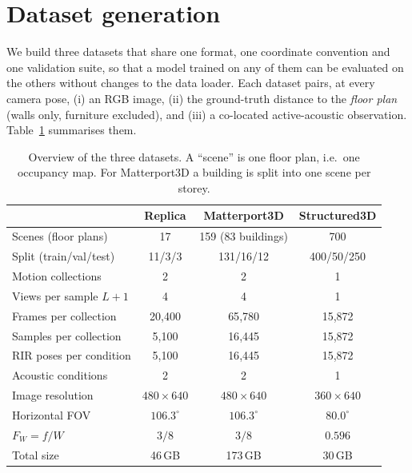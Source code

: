 %

\section{Dataset generation}
\label{sec:supp-data}

We build three datasets that share one format, one coordinate convention and one
validation suite, so that a model trained on any of them can be evaluated on the
others without changes to the data loader. Each dataset pairs, at every camera
pose, (i) an RGB image, (ii) the ground-truth distance to the \emph{floor plan}
(walls only, furniture excluded), and (iii) a co-located active-acoustic
observation. Table~\ref{tab:supp-overview} summarises them.

\begin{table}[t]
\centering
\caption{Overview of the three datasets. A ``scene'' is one floor plan, i.e.\ one
occupancy map. For Matterport3D a building is split into one scene per storey.}
\label{tab:supp-overview}
\small
\begin{tabular}{lccc}
\toprule
 & Replica & Matterport3D & Structured3D \\
\midrule
Scenes (floor plans)            & 17 & 159 (83 buildings) & 700 \\
Split (train/val/test)          & 11/3/3 & 131/16/12 & 400/50/250 \\
Motion collections              & 2 & 2 & 1 \\
Views per sample $L{+}1$        & 4 & 4 & 1 \\
Frames per collection           & 20{,}400 & 65{,}780 & 15{,}872 \\
Samples per collection          & 5{,}100 & 16{,}445 & 15{,}872 \\
RIR poses per condition         & 5{,}100 & 16{,}445 & 15{,}872 \\
Acoustic conditions             & 2 & 2 & 1 \\
Image resolution                & $480{\times}640$ & $480{\times}640$ & $360{\times}640$ \\
Horizontal FOV                  & $106.3^\circ$ & $106.3^\circ$ & $80.0^\circ$ \\
$F_W = f/W$                     & $3/8$ & $3/8$ & $0.596$ \\
Total size                      & 46\,GB & 173\,GB & 30\,GB \\
\bottomrule
\end{tabular}
\end{table}

